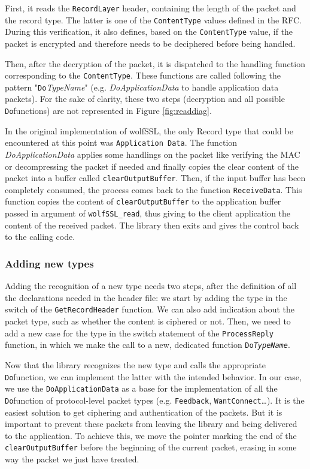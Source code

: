 First, it reads the \texttt{RecordLayer} header, containing the length of the packet and the record type. The latter is one of the \texttt{ContentType} values defined in the RFC\cite{rfc5246}. During this verification, it also defines, based on the \texttt{ContentType} value, if the packet is encrypted and therefore needs to be deciphered before being handled.

Then, after the decryption of the packet, it is dispatched to the handling function corresponding to the \texttt{ContentType}. These functions are called following the pattern "\texttt{Do}\textit{TypeName}" (e.g. \textit{DoApplicationData} to handle application data packets). For the sake of clarity, these two steps (decryption and all possible \texttt{Do}functions) are not represented in Figure \ref{fig:readdiag}.


In the original implementation of wolfSSL, the only Record type that could be encountered at this point was \texttt{Application Data}. The function \textit{DoApplicationData} applies some handlings on the packet like verifying the MAC or decompressing the packet if needed and finally copies the clear content of the packet into a buffer called \texttt{clearOutputBuffer}. Then, if the input buffer has been completely consumed, the process comes back to the function \texttt{ReceiveData}. This function copies the content of \texttt{clearOutputBuffer} to the application buffer passed in argument of \texttt{wolfSSL\_read}, thus giving to the client application the content of the received packet. The library then exits and gives the control back to the calling code.

\subsubsection{Adding new types}

Adding the recognition of a new type needs two steps, after the definition of all the declarations needed in the header file: we start by adding the type in the switch of the \texttt{GetRecordHeader} function. We can also add indication about the packet type, such as whether the content is ciphered or not. Then, we need to add a new case for the type in the switch statement of the \texttt{ProcessReply} function, in which we make the call to a new, dedicated function \texttt{Do\textit{TypeName}}.

Now that the library recognizes the new type and calls the appropriate \texttt{Do}function, we can implement the latter with the intended behavior. In our case, we use the \texttt{DoApplicationData} as a base for the implementation of all the \texttt{Do}function of protocol-level packet types (e.g. \texttt{Feedback}, \texttt{WantConnect}\dots). It is the easiest solution to get ciphering and authentication of the packets. But it is important to prevent these packets from leaving the library and being delivered to the application. To achieve this, we move the pointer marking the end of the \texttt{clearOutputBuffer} before the beginning of the current packet, erasing in some way the packet we just have treated.

